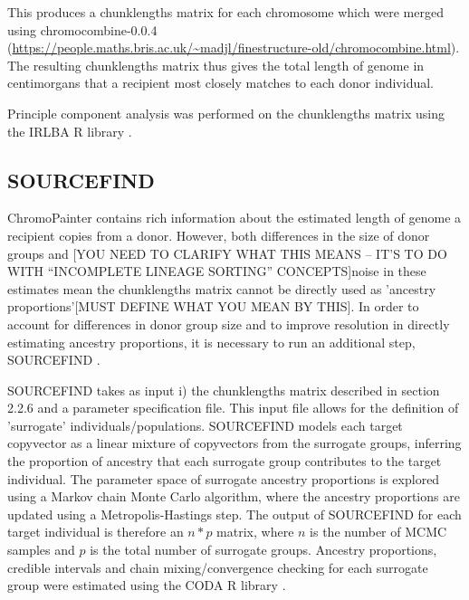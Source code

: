 This produces a chunklengths matrix for each chromosome which were merged using chromocombine-0.0.4 (\url{https://people.maths.bris.ac.uk/~madjl/finestructure-old/chromocombine.html}). The resulting chunklengths matrix thus gives the total length of genome in centimorgans that a recipient most closely matches to {\color{red}each} donor individual. 

Principle component analysis was performed on the chunklengths matrix using the IRLBA R library \cite{baglama2005augmented}.

\subsection{SOURCEFIND}

ChromoPainter contains rich information about the estimated length of genome a recipient copies from a donor. However, both differences in the size of donor groups and {\color{red}[YOU NEED TO CLARIFY WHAT THIS MEANS -- IT'S TO DO WITH ``INCOMPLETE LINEAGE SORTING'' CONCEPTS]noise in these estimates} mean the chunklengths matrix cannot be directly used as 'ancestry proportions'{\color{red}[MUST DEFINE WHAT YOU MEAN BY THIS]}. In order to account for differences in donor group size and to improve resolution in directly estimating ancestry proportions, it is necessary to run an additional step, SOURCEFIND \cite{Chacon-Duque2018}.

SOURCEFIND takes as input i) the chunklengths matrix described in section 2.2.6 and a parameter specification file. This input file allows for the definition of 'surrogate' individuals/populations. SOURCEFIND models each target copyvector as a linear mixture of copyvectors from the surrogate groups, {\color{red}inferring the proportion of ancestry that each surrogate group contributes to the target individual}. The parameter space of surrogate ancestry proportions is explored using {\color{red}a} Markov chain Monte Carlo algorithm, where the ancestry proportions are updated using {\color{red}a} Metropolis-Hastings step. The output of SOURCEFIND for each target individual is therefore an $n*p$ matrix, where $n$ is the number of {\color{red}MCMC samples} and $p$ is the total number of surrogate groups. Ancestry proportions, credible intervals and chain mixing/convergence checking for each surrogate group were estimated using the CODA R library \cite{oro22547}.

